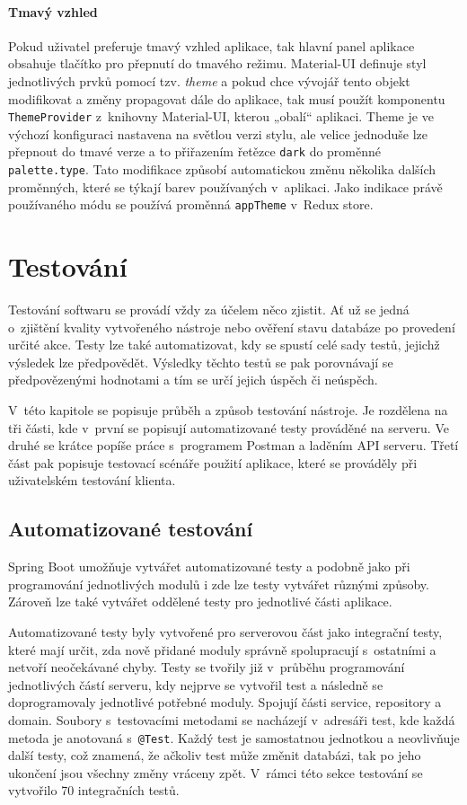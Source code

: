 \subsubsection *{Tmavý vzhled}

Pokud uživatel preferuje tmavý vzhled aplikace, tak hlavní panel aplikace obsahuje tlačítko pro přepnutí do tmavého režimu. Material-UI definuje styl jednotlivých prvků pomocí tzv. \textit{theme} a pokud chce vývojář tento objekt modifikovat a změny propagovat dále do aplikace, tak musí použít komponentu \texttt{ThemeProvider} z~knihovny Material-UI, kterou „obalí“ aplikaci. Theme je ve výchozí konfiguraci nastavena na světlou verzi stylu, ale velice jednoduše lze přepnout do tmavé verze a to přiřazením řetězce \texttt{dark} do proměnné \texttt{palette.type}. Tato modifikace způsobí automatickou změnu několika dalších proměnných, které se týkají barev používaných v~aplikaci. Jako indikace právě používaného módu se používá proměnná \texttt{appTheme} v~Redux store.

\chapter{Testování}
\label{testovani}

Testování softwaru se provádí vždy za účelem něco zjistit. Ať už se jedná o~zjištění kvality vytvořeného nástroje nebo ověření stavu databáze po provedení určité akce. Testy lze také automatizovat, kdy se spustí celé sady testů, jejichž výsledek lze předpovědět. Výsledky těchto testů se pak porovnávají se předpovězenými hodnotami a tím se určí jejich úspěch či neúspěch.  

V~této kapitole se popisuje průběh a způsob testování nástroje. Je rozdělena na tři části, kde v~první se popisují automatizované testy prováděné na serveru. Ve druhé se krátce popíše práce s~programem Postman a laděním API serveru. Třetí část pak popisuje testovací scénáře použití aplikace, které se prováděly při uživatelském testování klienta. 


\section{Automatizované testování}

Spring Boot umožňuje vytvářet automatizované testy a podobně jako při programování jednotlivých modulů i zde lze testy vytvářet různými způsoby. Zároveň lze také vytvářet oddělené testy pro jednotlivé části aplikace. 

Automatizované testy byly vytvořené pro serverovou část jako integrační testy, které mají určit, zda nově přidané moduly správně spolupracují s~ostatními a netvoří neočekávané chyby. Testy se tvořily již v~průběhu programování jednotlivých částí serveru, kdy nejprve se vytvořil test a následně se doprogramovaly jednotlivé potřebné moduly. Spojují části service, repository a domain. Soubory s~testovacími metodami se nacházejí v~adresáři test, kde každá metoda je anotovaná s~\texttt{@Test}. Každý test je samostatnou jednotkou a neovlivňuje další testy, což znamená, že ačkoliv test může změnit databázi, tak po jeho ukončení jsou všechny změny vráceny zpět. V~rámci této sekce testování se vytvořilo 70 integračních testů.


